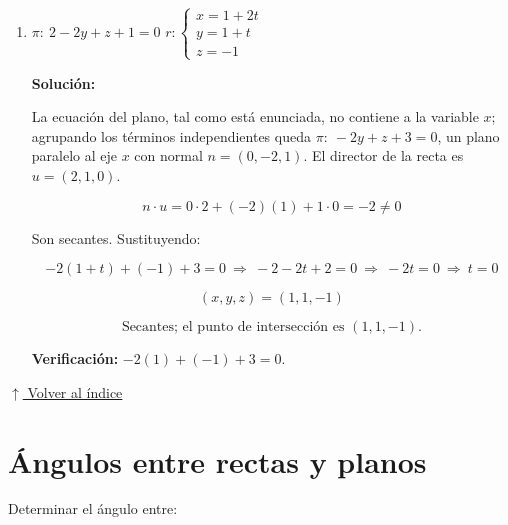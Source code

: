\documentclass[12pt]{article}
\newcommand{\solucion}{%
    \vspace{0.8em}%
    \textbf{Solución:}%
    \vspace{0.8em}%
}
\newcommand{\volverindice}{%
    \vspace{1em}%
    \begin{flushright}%
        \hyperlink{indice}{\small $\uparrow$ Volver al índice}%
    \end{flushright}%
}
\begin{document}
\begin{enumerate}[label=\alph*.-]
    \[
    \boxed{\text{Secantes; el punto de intersección es } (4,6,-5).}
    \]

    \textbf{Verificación:} $3(4)-6+(-5)-1=12-6-5-1=0$. \checkmark

    \item $\pi:\ 2-2y+z+1=0$ \qquad
    $r:\begin{cases} x=1+2t\\ y=1+t\\ z=-1 \end{cases}$

    \solucion

    La ecuación del plano, tal como está enunciada, no contiene a la
    variable $x$; agrupando los términos independientes queda
    $\pi:\ -2y+z+3=0$, un plano paralelo al eje $x$ con normal
    $n=(0,-2,1)$. El director de la recta es $u=(2,1,0)$.

    \[
    n\cdot u=0\cdot2+(-2)(1)+1\cdot0=-2\neq0
    \]

    Son secantes. Sustituyendo:

    \[
    -2(1+t)+(-1)+3=0\ \Longrightarrow\ -2-2t+2=0
    \ \Longrightarrow\ -2t=0\ \Longrightarrow\ t=0
    \]

    \[
    (x,y,z)=(1,1,-1)
    \]

    \[
    \boxed{\text{Secantes; el punto de intersección es } (1,1,-1).}
    \]

    \textbf{Verificación:} $-2(1)+(-1)+3=0$. \checkmark

\end{enumerate}

\volverindice
\newpage


\section{Ángulos entre rectas y planos}

Determinar el ángulo entre:
\end{document}
